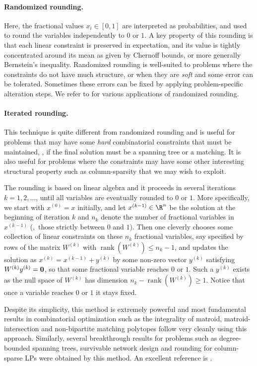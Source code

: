 \documentclass{toc}
\newcommand{\rank}{\operatorname{rank}}
\begin{document}
\paragraph{Randomized rounding.} Here, the fractional values $x_i \in [0,1]$ are
interpreted as probabilities, and used to round the variables independently
to $0$ or $1$.
%
%
A key property of this rounding is that each linear constraint
is preserved in expectation, and its value is tightly  concentrated around
its mean as given by Chernoff bounds, or more generally
Bernstein's inequality.
Randomized rounding is well-suited to problems where the  constraints do not have much structure, or when they are \emph{soft} and some error can be tolerated. Sometimes these errors can be fixed by applying problem-specific alteration steps.
%
We refer to \cite{SW11, Vazirani01} for various applications of randomized rounding.

\paragraph{Iterated rounding.} This technique is quite different from randomized rounding and is useful for problems that may have  some \emph{hard} combinatorial constraints that must be maintained, \eg, if the final solution must be a spanning tree or a matching. It is also useful for problems where the constraints may have some other interesting structural property such as column-sparsity that we may wish to exploit.

The rounding is based on linear algebra and it proceeds in several iterations $k=1,2,\ldots$, until
all variables are eventually rounded to $0$ or $1$. More specifically, we start with $x^{(0)}=x$ initially, and let $x^{(k-1)} \in \R^n$ be the
solution at the beginning
of iteration $k$ and $n_k$ denote the number
of fractional variables in $x^{(k-1)}$  (\ie,~those strictly between $0$ and $1$).
Then one cleverly chooses some collection of linear constraints on these $n_k$ fractional variables, say specified by rows of the
matrix $W^{(k)}$ with 
$\rank(W^{(k)}) \leq n_k-1$, and updates the solution as $x^{(k)} = x^{(k-1)} + y^{(k)}$ by some non-zero vector $y^{(k)}$ satisfying $W^{(k)} y^{(k)}=\bf{0}$,
so that some
fractional variable reaches $0$ or $1$. Such a $y^{(k)}$ exists as the null space of $W^{(k)}$ has dimension $n_k - \rank(W^{(k)}) \geq 1$.
Notice that once a variable reaches $0$ or $1$ it stays fixed.

Despite its simplicity, this method is extremely powerful and
most fundamental results in combinatorial optimization
such as the integrality of matroid, matroid-intersection and non-bipartite
matching polytopes follow very cleanly using this approach.
Similarly, several breakthrough results for problems such
as degree-bounded spanning trees, survivable network design
and rounding for column-sparse LPs
were obtained by this method. An excellent reference is \cite{Lau-book}.
\end{document}
